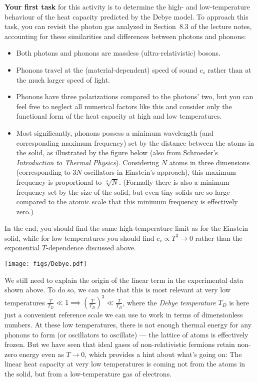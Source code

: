 \documentclass[12 pt]{article} %
\begin{document}
\textbf{Your first task} for this activity is to determine the high- and low-temperature behaviour of the heat capacity predicted by the Debye model.
To approach this task, you can revisit the photon gas analyzed in Section~8.3 of the lecture notes, accounting for these similarities and differences between photons and phonons: \\[-24 pt]
\begin{itemize}
  \item Both photons and phonons are massless (ultra-relativistic) bosons.
  \item Phonons travel at the (material-dependent) speed of sound $c_s$ rather than at the much larger speed of light.
  \item Phonons have three polarizations compared to the photons' two, but you can feel free to neglect all numerical factors like this and consider only the functional form of the heat capacity at high and low temperatures.
  \item Most significantly, phonons possess a minimum wavelength (and corresponding maximum frequency) set by the distance between the atoms in the solid, as illustrated by the figure below (also from Schroeder's \textit{Introduction to Thermal Physics}).
        Considering $N$ atoms in three dimensions (corresponding to $3N$ oscillators in Einstein's approach), this maximum frequency is proportional to $\sqrt[3]{N}$.
        (Formally there is also a minimum frequency set by the size of the solid, but even tiny solids are so large compared to the atomic scale that this minimum frequency is effectively zero.)
\end{itemize}
In the end, you should find the same high-temperature limit as for the Einstein solid, while for low temperatures you should find $c_v \propto T^3 \to 0$ rather than the exponential $T$-dependence discussed above.

\begin{center}\texttt{[image: figs/Debye.pdf]}\end{center}

We still need to explain the origin of the linear term in the experimental data shown above.
To do so, we can note that this is most relevant at very low temperatures $\frac{T}{T_D} \ll 1 \implies \left(\frac{T}{T_D}\right)^3 \ll \frac{T}{T_D}$, where the \textit{Debye temperature} $T_D$ is here just a convenient reference scale we can use to work in terms of dimensionless numbers.
At these low temperatures, there is not enough thermal energy for any phonons to form (or oscillators to oscillate) --- the lattice of atoms is effectively frozen.
But we have seen that ideal gases of non-relativistic fermions retain non-zero energy even as $T \to 0$, which provides a hint about what's going on: The linear heat capacity at very low temperatures is coming not from the atoms in the solid, but from a low-temperature gas of electrons.
\end{document}
